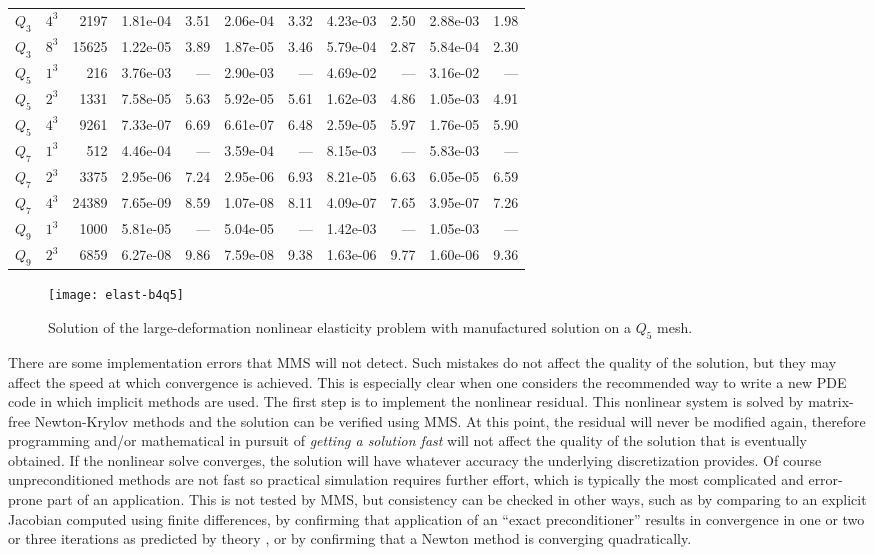 \begin{table}
\begin{tabular}{lrr rr rr rr rr}
$Q_3$ & $4^3$ & 2197 & 1.81e-04 & 3.51 & 2.06e-04 & 3.32 & 4.23e-03 & 2.50 & 2.88e-03 & 1.98 \\
$Q_3$ & $8^3$ & 15625 & 1.22e-05 & 3.89 & 1.87e-05 & 3.46 & 5.79e-04 & 2.87 & 5.84e-04 & 2.30\\
\midrule
$Q_5$ & $1^3$ & 216 & 3.76e-03 & --- & 2.90e-03 & --- & 4.69e-02 & --- & 3.16e-02 & --- \\
$Q_5$ & $2^3$ & 1331 & 7.58e-05 & 5.63 & 5.92e-05 & 5.61 & 1.62e-03 & 4.86 & 1.05e-03 & 4.91 \\
$Q_5$ & $4^3$ & 9261 & 7.33e-07 & 6.69 & 6.61e-07 & 6.48 & 2.59e-05 & 5.97 & 1.76e-05 & 5.90\\
\midrule
$Q_7$ & $1^3$ & 512 & 4.46e-04 & --- & 3.59e-04 & --- & 8.15e-03 & --- & 5.83e-03 & --- \\
$Q_7$ & $2^3$ & 3375 & 2.95e-06 & 7.24 & 2.95e-06 & 6.93 & 8.21e-05 & 6.63 & 6.05e-05 & 6.59 \\
$Q_7$ & $4^3$ & 24389 & 7.65e-09 & 8.59 & 1.07e-08 & 8.11 & 4.09e-07 & 7.65 & 3.95e-07 & 7.26\\
\midrule
$Q_9$ & $1^3$ & 1000 & 5.81e-05 & --- & 5.04e-05 & --- & 1.42e-03 & --- & 1.05e-03 & --- \\
$Q_9$ & $2^3$ & 6859 & 6.27e-08 & 9.86 & 7.59e-08 & 9.38 & 1.63e-06 & 9.77 & 1.60e-06 & 9.36 \\
\bottomrule
  \end{tabular}
\end{table}

\begin{figure}
  \centering\texttt{[image: elast-b4q5]}
  \caption{Solution of the large-deformation nonlinear elasticity problem with manufactured solution on a $Q_5$ mesh.}\label{fig:elastexact}
\end{figure}

There are some implementation errors that MMS will not detect.
Such mistakes do not affect the quality of the solution, but they may affect the speed at which convergence is achieved.
This is especially clear when one considers the recommended way to write a new PDE code in which implicit methods are used.
The first step is to implement the nonlinear residual.
This nonlinear system is solved by matrix-free Newton-Krylov methods and the solution can be verified using MMS.
At this point, the residual will never be modified again, therefore programming and/or mathematical in pursuit of \emph{getting a solution fast} will not affect the quality of the solution that is eventually obtained.
If the nonlinear solve converges, the solution will have whatever accuracy the underlying discretization provides.
Of course unpreconditioned methods are not fast so practical simulation requires further effort, which is typically the most complicated and error-prone part of an application.
This is not tested by MMS, but consistency can be checked in other ways, such as by comparing to an explicit Jacobian computed using finite differences, by confirming that application of an ``exact preconditioner'' results in convergence in one or two or three iterations as predicted by theory \citep[\eg][]{murphy2000npi,ipsen2001note}, or by confirming that a Newton method is converging quadratically.


